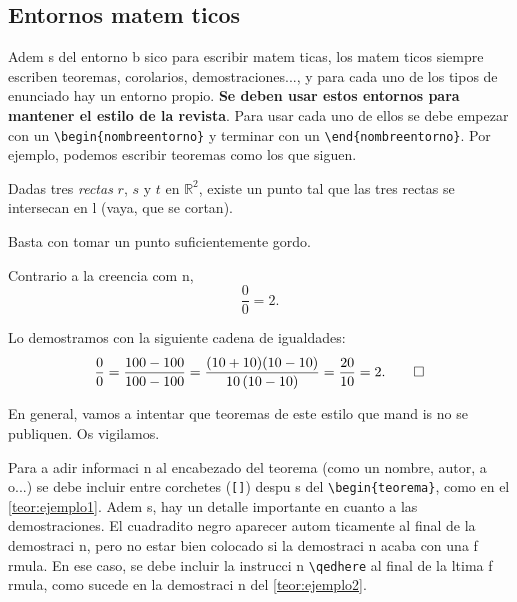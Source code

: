 \documentclass{article}
\begin{document}
\subsection{Entornos matem ticos}

Adem s del entorno b sico para escribir matem ticas, los matem ticos siempre escriben teoremas, corolarios, demostraciones..., y para cada uno de los tipos de enunciado hay un entorno propio.
\textbf{Se deben usar estos entornos para mantener el estilo de la revista}.
Para usar cada uno de ellos se debe empezar con un \verb+\begin{nombreentorno}+ y terminar con un \verb+\end{nombreentorno}+.
Por ejemplo, podemos escribir teoremas como los que siguen.

\begin{teorema}\label{teor:ejemplo1}
Dadas tres \emph{rectas} $r$,\/ $s$ y\/ $t$ en\/ $\mathbb{R}^2$, existe un punto tal que las tres rectas se intersecan en  l (vaya, que se cortan).
\end{teorema}

\begin{demostracion}
Basta con tomar un punto suficientemente gordo.
\end{demostracion}

\begin{teorema}\label{teor:ejemplo2}
Contrario a la creencia com n,
\[\frac{0}{0}=2.\]
\end{teorema}

\begin{demostracion}
Lo demostramos con la siguiente cadena de igualdades:
\[\frac{0}{0}=\frac{100-100}{100-100}=\frac{(10+10)(10-10)}{10\,(10-10)}=\frac{20}{10}=2.\qedhere\]
\end{demostracion}

\begin{nota*}
En general, vamos a intentar que teoremas de este estilo que mand is no se publiquen. Os vigilamos.
\end{nota*}

Para a adir informaci n al encabezado del teorema (como un nombre, autor, a o...) se debe incluir entre corchetes (\verb+[]+) despu s del \verb+\begin{teorema}+, como en el \autoref{teor:ejemplo1}.
Adem s, hay un detalle importante en cuanto a las demostraciones.
El cuadradito negro aparecer  autom ticamente al final de la demostraci n, pero no estar  bien colocado si la demostraci n acaba con una f rmula.
En ese caso, se debe incluir la instrucci n \verb+\qedhere+ al final de la  ltima f rmula, como sucede en la demostraci n del \autoref{teor:ejemplo2}.
\end{document}
